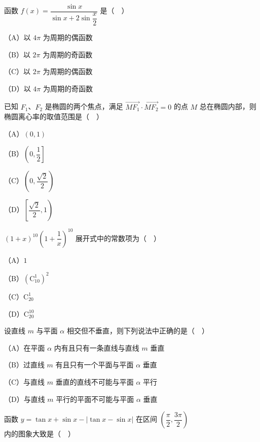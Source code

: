 \begin{question}
函数 $f(x)=\dfrac{\sin x}{\sin x+2\sin\dfrac x2}$ 是（　）

（A）以 $4\pi$ 为周期的偶函数

（B）以 $2\pi$ 为周期的奇函数

（C）以 $2\pi$ 为周期的偶函数

（D）以 $4\pi$ 为周期的奇函数

\end{question}
\begin{question}
已知 $F_1$、$F_2$ 是椭圆的两个焦点，满足 $\overrightarrow{MF_1}\cdot\overrightarrow{MF_2}=0$ 的点 $M$ 总在椭圆内部，则椭圆离心率的取值范围是（　）

（A）$(0,1)$

（B）$\left(0,\dfrac12\right]$

（C）$\left(0,\dfrac{\sqrt2}2\right)$

（D）$\left[\dfrac{\sqrt2}2,1\right)$

\end{question}
\begin{question}
$(1+x)^{10}\left(1+\dfrac1x\right)^{10}$ 展开式中的常数项为（　）

（A）$1$

（B）$(\mathrm C_{10}^1)^2$

（C）$\mathrm C_{20}^1$

（D）$\mathrm C_{20}^{10}$

\end{question}
\begin{question}
设直线 $m$ 与平面 $\alpha$ 相交但不垂直，则下列说法中正确的是（　）

（A）在平面 $\alpha$ 内有且只有一条直线与直线 $m$ 垂直

（B）过直线 $m$ 有且只有一个平面与平面 $\alpha$ 垂直

（C）与直线 $m$ 垂直的直线不可能与平面 $\alpha$ 平行

（D）与直线 $m$ 平行的平面不可能与平面 $\alpha$ 垂直

\Needspace{0.4\textheight}
\end{question}
\begin{question}
函数 $y=\tan x+\sin x-|\tan x-\sin x|$ 在区间 $\left(\dfrac{\pi}2,\dfrac{3\pi}2\right)$ 内的图象大致是（　）
\nopagebreak[4]
\begin{center}\end{center}
\nopagebreak[4]
\end{question}

